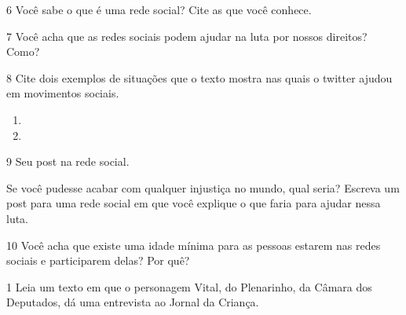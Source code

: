 \num{6} Você sabe o que é uma rede social? Cite as que você conhece.


\num{7} Você acha que as redes sociais podem ajudar na luta por nossos direitos? Como?


\pagebreak
\num{8} Cite dois exemplos de situações que o texto mostra nas quais o twitter ajudou
em movimentos sociais.

\begin{enumerate}
\item {}

\item {}
\end{enumerate}

\num{9} Seu post na rede social.

Se você pudesse acabar com qualquer injustiça no mundo, qual seria?
Escreva um post para uma rede social em que você explique o que faria para ajudar nessa luta.

\begin{mdframed}[linewidth=2pt,linecolor=salmao]
\vspace{8cm}
\end{mdframed}

\num{10} Você acha que existe uma idade mínima para as pessoas estarem nas redes sociais e participarem delas? Por quê?



\num{1}
Leia um texto em que o personagem Vital, do Plenarinho, da Câmara dos Deputados, dá uma entrevista ao Jornal da Criança.\bigskip

